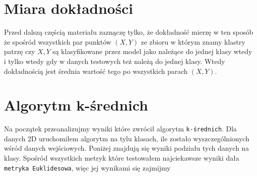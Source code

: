 \documentclass[polish,12pt,a4paper]{extarticle}
\begin{document}
\section*{Miara dokładności}
Przed dalszą częścią materiału zaznączę tylko, że dokładność mierzę w ten sposób że spośród wszystkich par punktów $(X, Y)$ ze zbioru w którym znamy klastry patrzę czy $X, Y$ są klasyfikowane przez model jako należące do jednej klasy wtedy i tylko wtedy gdy w danych testowych też należą do jednej klasy. Wtedy dokładnością jest średnia wartość tego po wszystkich parach $(X, Y)$.

\section*{Algorytm k-średnich}

Na początek przeanalizujmy wyniki które zwrócił algorytm \texttt{k-średnich}.
Dla danych 2D uruchomiłem algorytm na tylu klasach, ile zostało wyszczególnionych wśród danych wejściowych. Poniżej znajdują się wyniki podziału tych danych na klasy. Spośród wszystkich metryk które testowałem najciekawsze wyniki dała \texttt{metryka Euklidesowa}, więc jej wynikami się zajmijmy
\end{document}
